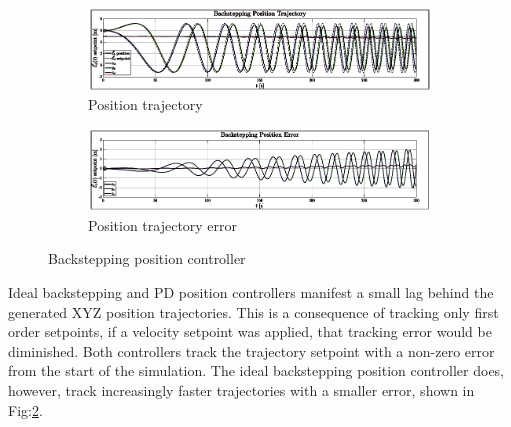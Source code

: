 \begin{figure}[htbp]
\centering
\vspace{-8pt}
\begin{subfigure}{0.9\textwidth}
\centering
\includegraphics[width=\textwidth]{graphs/IBC_Position_Trajectory}
\vspace{-18pt}
\caption{Position trajectory}
\label{fig:ibc_position_trajectory}
\end{subfigure}
\begin{subfigure}{0.9\textwidth}
\centering
\includegraphics[width=\textwidth]{graphs/IBC_Position_Error}
\vspace{-18pt}
\caption{Position trajectory error}
\label{fig:ibc_position_error}
\end{subfigure}
\vspace{-10pt}
\caption{Backstepping position controller}
\label{fig:ibc_position}
\end{figure}
Ideal backstepping and PD position controllers manifest a small lag behind the generated XYZ position trajectories. This is a consequence of tracking only first order setpoints, if a velocity setpoint was applied, that tracking error would be diminished. Both controllers track the trajectory setpoint with a non-zero error from the start of the simulation. The ideal backstepping position controller does, however, track increasingly faster trajectories with a smaller error, shown in Fig:\ref{fig:ibc_position_error}.
